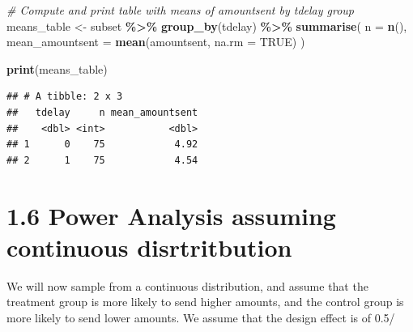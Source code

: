 \documentclass[
]{article}
\newenvironment{Shaded}{\begin{snugshade}}{\end{snugshade}}
\newcommand{\AttributeTok}[1]{\textcolor[rgb]{0.13,0.29,0.53}{#1}}
\newcommand{\CommentTok}[1]{\textcolor[rgb]{0.56,0.35,0.01}{\textit{#1}}}
\newcommand{\ConstantTok}[1]{\textcolor[rgb]{0.56,0.35,0.01}{#1}}
\newcommand{\FunctionTok}[1]{\textcolor[rgb]{0.13,0.29,0.53}{\textbf{#1}}}
\newcommand{\NormalTok}[1]{#1}
\newcommand{\OtherTok}[1]{\textcolor[rgb]{0.56,0.35,0.01}{#1}}
\newcommand{\SpecialCharTok}[1]{\textcolor[rgb]{0.81,0.36,0.00}{\textbf{#1}}}
\begin{document}
\begin{Shaded}
\begin{Highlighting}[]
\CommentTok{\# Compute and print table with means of amountsent by tdelay group}
\NormalTok{means\_table }\OtherTok{\textless{}{-}}\NormalTok{ subset }\SpecialCharTok{\%\textgreater{}\%}
  \FunctionTok{group\_by}\NormalTok{(tdelay) }\SpecialCharTok{\%\textgreater{}\%}
  \FunctionTok{summarise}\NormalTok{(}
    \AttributeTok{n =} \FunctionTok{n}\NormalTok{(),}
    \AttributeTok{mean\_amountsent =} \FunctionTok{mean}\NormalTok{(amountsent, }\AttributeTok{na.rm =} \ConstantTok{TRUE}\NormalTok{)}
\NormalTok{  )}

\FunctionTok{print}\NormalTok{(means\_table)}
\end{Highlighting}
\end{Shaded}

\begin{verbatim}
## # A tibble: 2 x 3
##   tdelay     n mean_amountsent
##    <dbl> <int>           <dbl>
## 1      0    75            4.92
## 2      1    75            4.54
\end{verbatim}

\section{1.6 Power Analysis assuming continuous
disrtritbution}\label{power-analysis-assuming-continuous-disrtritbution}

We will now sample from a continuous distribution, and assume that the
treatment group is more likely to send higher amounts, and the control
group is more likely to send lower amounts. We assume that the design
effect is of 0.5/
\end{document}
